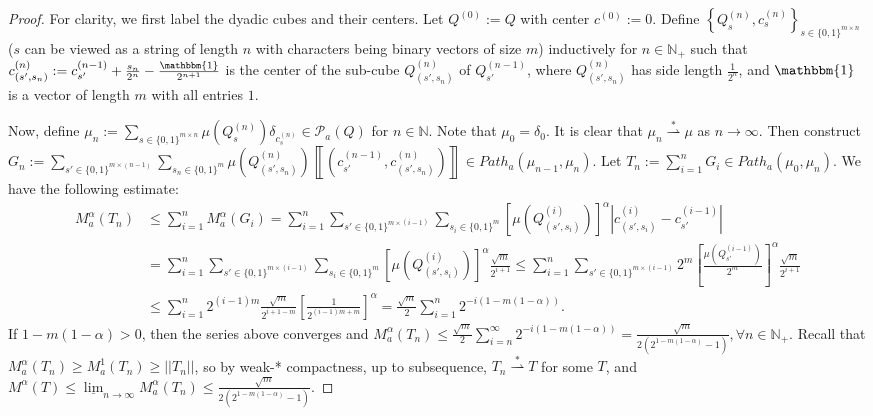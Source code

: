 \documentclass[fleqn]{article}
\theoremstyle{definition}
\theoremstyle{remark}
\newcommand{\linf}[1][n]{\underline{\lim}_{#1\rightarrow\infty}} %
\renewcommand{\P}{\mathcal{P}} %
\newcommand{\wstar}{\stackrel{*}{\rightharpoonup}} %
\begin{document}
\begin{proof}
For clarity, we first label the dyadic cubes and their centers. Let $Q^{(0)}:=Q$ with center $c^{(0)}:=0$. Define $\left\{Q^{(n)}_{s}, c^{(n)}_{s}\right\}_{s\in\{0,1\}^{m\times n}}$ ($s$ can be viewed as a string of length $n$ with characters being binary vectors of size $m$) inductively for $n\in\mathbb{N}_+$ such that ${ c^{(n)}_{(s',s_n)}:=c^{(n-1)}_{s'}+\frac{s_n}{2^n}-\frac{\mathbbm{1}}{2^{n+1}} }$ is the center of the sub-cube $Q^{(n)}_{(s',s_n)}$ of $Q^{(n-1)}_{s'}$, where $Q^{(n)}_{(s',s_n)}$ has side length $\frac{1}{2^n}$, and $\mathbbm{1}$ is a vector of length $m$ with all entries $1$.
\par
Now, define $\mu_n := \sum_{s\in\{0,1\}^{m\times n}} \mu\left(Q^{(n)}_s\right)\delta_{c^{(n)}_s} \in \P_a(Q)$ for $n\in\mathbb{N}$. Note that $\mu_0=\delta_0$. It is clear that $\mu_n \wstar \mu$ as $n\rightarrow\infty$. Then construct $G_n := \sum_{s' \in\{0,1\}^{m\times (n-1)}} \sum_{s_n\in\{0,1\}^{m}} \mu\left(Q^{(n)}_{(s',s_n)}\right) \left\llbracket \left(c^{(n-1)}_{s'}, c^{(n)}_{(s',s_n)} \right) \right\rrbracket \in Path_a(\mu_{n-1},\mu_{n})$. Let $T_n :=\sum_{i=1}^n G_i \in Path_a(\mu_0,\mu_n)$. We have the following estimate:
\begin{align*}
M_a^\alpha(T_n) & \le \sum_{i=1}^n M_a^\alpha(G_i) = \sum_{i=1}^n \sum_{s' \in\{0,1\}^{m\times (i-1)}} \sum_{s_i\in\{0,1\}^{m}} \left[\mu\left(Q^{(i)}_{(s',s_i)}\right)\right]^\alpha \left| c^{(i)}_{(s',s_i)}-c^{(i-1)}_{s'} \right| \\
& =  \sum_{i=1}^n \sum_{s' \in\{0,1\}^{m\times (i-1)}} \sum_{s_i\in\{0,1\}^{m}} \left[\mu\left(Q^{(i)}_{(s',s_i)}\right)\right]^\alpha \frac{\sqrt{m}}{2^{i+1}}
\le \sum_{i=1}^n \sum_{s' \in\{0,1\}^{m\times (i-1)}} 2^m \left[\frac{\mu\left(Q^{(i-1)}_{s'}\right)}{2^m}\right]^\alpha \frac{\sqrt{m}}{2^{i+1}} \\
& \le \sum_{i=1}^n 2^{(i-1)m}\frac{\sqrt{m}}{2^{i+1-m}} \left[\frac{1}{2^{(i-1)m+m}}\right]^\alpha
= \frac{\sqrt{m}}{2}\sum_{i=1}^n 2^{-i(1-m(1-\alpha))}.
\end{align*}
If $1-m(1-\alpha)>0$, then the series above converges and $M_a^\alpha(T_n) \le \frac{\sqrt{m}}{2}\sum_{i=n}^\infty 2^{-i(1-m(1-\alpha))} = \frac{\sqrt{m}}{2\left(2^{1-m(1-\alpha)}-1\right)}, \forall n\in\mathbb{N}_+$.
Recall that $M_a^\alpha(T_n) \ge M_a^1(T_n) \ge ||T_n||$, so by weak-* compactness, up to subsequence, $T_n \wstar T$ for some $T$, and $M^\alpha(T) \le \linf M_a^\alpha(T_n) \le \frac{\sqrt{m}}{2\left(2^{1-m(1-\alpha)}-1\right)}$.
\end{proof}
\end{document}
